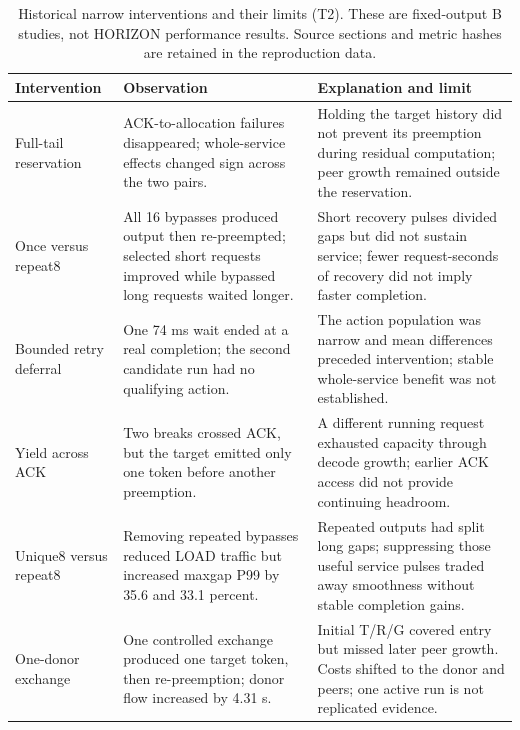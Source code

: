 \begin{table}[ht]
\centering\small
\caption{Historical narrow interventions and their limits (T2). These are fixed-output B studies, not HORIZON performance results. Source sections and metric hashes are retained in the reproduction data.}
\label{tab:historical}
\begin{tabular}{>{\raggedright\arraybackslash}p{}>{\raggedright\arraybackslash}p{}>{\raggedright\arraybackslash}p{}}
\toprule
Intervention & Observation & Explanation and limit \\
\midrule
Full-tail reservation & ACK-to-allocation failures disappeared; whole-service effects changed sign across the two pairs. & Holding the target history did not prevent its preemption during residual computation; peer growth remained outside the reservation. \\[4pt]
Once versus repeat8 & All 16 bypasses produced output then re-preempted; selected short requests improved while bypassed long requests waited longer. & Short recovery pulses divided gaps but did not sustain service; fewer request-seconds of recovery did not imply faster completion. \\[4pt]
Bounded retry deferral & One 74 ms wait ended at a real completion; the second candidate run had no qualifying action. & The action population was narrow and mean differences preceded intervention; stable whole-service benefit was not established. \\[4pt]
Yield across ACK & Two breaks crossed ACK, but the target emitted only one token before another preemption. & A different running request exhausted capacity through decode growth; earlier ACK access did not provide continuing headroom. \\[4pt]
Unique8 versus repeat8 & Removing repeated bypasses reduced LOAD traffic but increased maxgap P99 by 35.6 and 33.1 percent. & Repeated outputs had split long gaps; suppressing those useful service pulses traded away smoothness without stable completion gains. \\[4pt]
One-donor exchange & One controlled exchange produced one target token, then re-preemption; donor flow increased by 4.31 s. & Initial T/R/G covered entry but missed later peer growth. Costs shifted to the donor and peers; one active run is not replicated evidence. \\[4pt]
\bottomrule
\end{tabular}
\end{table}
